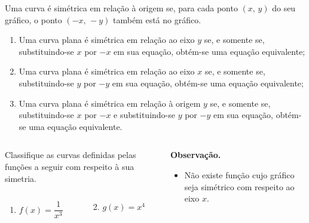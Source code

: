 \begin{frame}
  \begin{theorem}
    Uma curva é simétrica em relação à origem se, para cada ponto $(x,\,y)$ do seu gráfico, o ponto $(-x,\,-y)$ também está no gráfico.
    \begin{enumerate}
      \item Uma curva plana é simétrica em relação ao eixo $y$ se, e somente se, substituindo-se $x$ por $-x$ em sua equação, obtém-se uma equação equivalente;
      \item Uma curva plana é simétrica em relação ao eixo $x$ se, e somente se, substituindo-se $y$ por $-y$ em sua equação, obtém-se uma equação equivalente;
      \item Uma curva plana é simétrica em relação à origem $y$ se, e somente se, substituindo-se $x$ por $-x$ e substituindo-se $y$ por $-y$ em sua equação, obtém-se uma equação equivalente.
    \end{enumerate}
  \end{theorem}
  \begin{columns}[onlytextwidth]
    \begin{column}{0.49\textwidth}
      \vspace*{-0.15cm}
      \begin{example-highlight}
        Classifique as curvas definidas pelas funções a seguir com respeito à sua simetria.
        \begin{columns}[onlytextwidth]
          \begin{column}{0.49\textwidth}\vspace*{-0.35cm}
            \begin{enumerate}
              \item $f(x)=\dfrac{1}{x^{3}}$
            \end{enumerate}
          \end{column}
          \begin{column}{0.49\textwidth}\vspace*{-0.35cm}
            \begin{enumerate}\setcounter{enumi}{1}
              \item $g(x)=x^{4}$
            \end{enumerate}
          \end{column}
        \end{columns}
      \end{example-highlight}
    \end{column}
    \begin{column}{0.49\textwidth}
      \vspace*{-0.09cm}
      \begin{highlight}
        \textbf{Observação.}
        \begin{itemize}
          \item Não existe função cujo gráfico seja simétrico com respeito ao eixo $x$.
        \end{itemize}
      \end{highlight}
    \end{column}
  \end{columns}
\end{frame}

